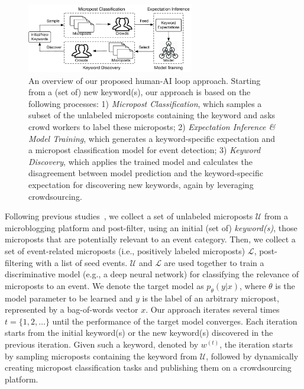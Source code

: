 \documentclass[letterpaper]{article}
\begin{document}
\begin{figure}[t!]
\centering
\includegraphics[width=0.65\textwidth]{img/framework}
\caption{An overview of our proposed human-AI loop approach. Starting from a (set of) new keyword(s), our approach is based on the following processes: 1) \emph{Micropost Classification}, which samples a subset of the unlabeled microposts containing the keyword and asks crowd workers to label these microposts; 2) \emph{Expectation Inference \& Model Training}, which generates a keyword-specific expectation and a micropost classification model for event detection; 3) \emph{Keyword Discovery}, which applies the trained model and calculates the disagreement between model prediction and the keyword-specific expectation for discovering new keywords, again by leveraging crowdsourcing.}
\label{fig:system}
\end{figure}

Following previous studies~\cite{ritter2015weakly,chang2016expectation,chambers2018detecting}, we collect a set of unlabeled microposts $\mathcal{U}$ from a microblogging platform and post-filter,  using an initial (set of) \emph{keyword(s)}, those microposts that are potentially relevant to an event category. Then, we collect a set of event-related microposts (i.e., positively labeled microposts) $\mathcal{L}$, post-filtering with a list of seed events. $\mathcal{U}$ and $\mathcal{L}$ are used together to train a discriminative model (e.g., a deep neural network) for classifying the relevance of microposts to an event. We denote the target model as $p_\theta(y|x)$, where $\theta$ is the model parameter to be learned and $y$ is the label of an arbitrary micropost, represented by a bag-of-words vector $x$. Our approach iterates several times $t=\{1, 2, \ldots\}$ until the performance of the target model converges. Each iteration starts from the initial keyword(s) or the new keyword(s) discovered in the previous iteration. Given such a keyword, denoted by $w^{(t)}$, the iteration starts by sampling microposts containing the keyword from $\mathcal{U}$, followed by dynamically creating micropost classification tasks and publishing them on a crowdsourcing platform.
\end{document}
